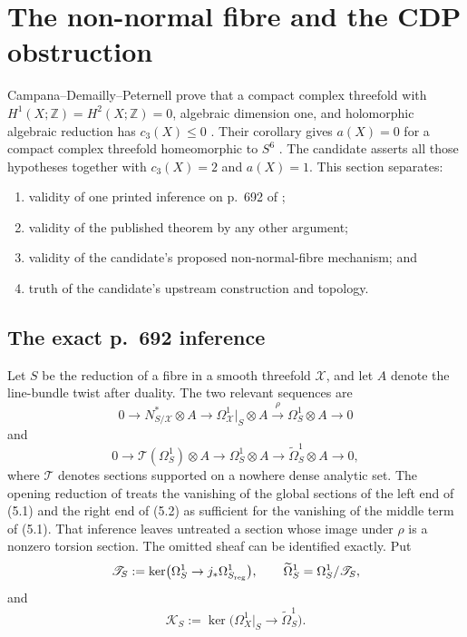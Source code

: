 \section{The non-normal fibre and the CDP obstruction}

Campana--Demailly--Peternell prove that a compact complex threefold with
$H^1(X;\mathbb Z)=H^2(X;\mathbb Z)=0$, algebraic dimension one, and
holomorphic algebraic reduction has $c_3(X)\le0$
\cite[Theorem~2.2, p.~680]{CDP2020}.  Their corollary gives $a(X)=0$ for
a compact complex threefold homeomorphic to $S^6$
\cite[Corollary~2.3, p.~680]{CDP2020}.  The candidate asserts all those
hypotheses together with $c_3(X)=2$ and $a(X)=1$.  This section separates:
\begin{enumerate}[label=(\roman*)]
\item validity of one printed inference on p.~692 of \cite{CDP2020};
\item validity of the published theorem by any other argument;
\item validity of the candidate's proposed non-normal-fibre mechanism; and
\item truth of the candidate's upstream construction and topology.
\end{enumerate}

\subsection{The exact p.~692 inference}

Let $S$ be the reduction of a fibre in a smooth threefold $\mathcal X$,
and let $A$ denote the line-bundle twist after duality.  The two relevant
sequences are
\[
0\longrightarrow N^*_{S/\mathcal X}\otimes A
\longrightarrow\Omega^1_{\mathcal X}|_S\otimes A
\xrightarrow{\rho}\Omega^1_S\otimes A\longrightarrow0
\tag{5.1}
\]
and
\[
0\longrightarrow\mathcal T(\Omega^1_S)\otimes A
\longrightarrow\Omega^1_S\otimes A
\longrightarrow\widetilde\Omega^1_S\otimes A\longrightarrow0,
\tag{5.2}
\]
where $\mathcal T$ denotes sections supported on a nowhere dense analytic
set.  The opening reduction of \cite[\S7, p.~692]{CDP2020} treats the
vanishing of the global sections of the left end of (5.1) and the right end
of (5.2) as sufficient for the vanishing of the middle term of (5.1).
That inference leaves untreated a section whose image under $\rho$ is a
nonzero torsion section.  The omitted sheaf can be identified exactly.  Put
\[
 \mathscr T_S:=\ker\bigl(\Omega_S^1\to
 j_*\Omega^1_{S_{\rm reg}}\bigr),
 \qquad \widetilde\Omega_S^1=\Omega_S^1/\mathscr T_S,
\]
and
\[
 \mathscr K_S:=
 \ker\bigl(\Omega_X^1|_S\longrightarrow\widetilde\Omega_S^1\bigr).
\]

